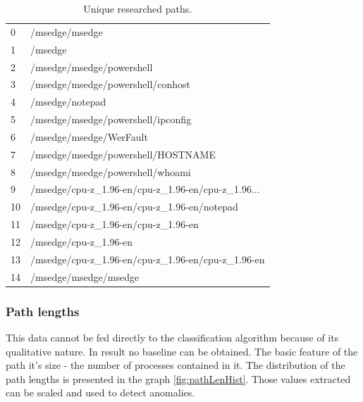 \documentclass[a4paper,twoside,12pt]{book}
\begin{document}
\begin{table}
	\centering
	\caption{Unique researched paths.}
	\label{id:tab:uniqPaths}
	\begin{tabular}{ll}
		\toprule
		0  &                                     /msedge/msedge \\
		1  &                                            /msedge \\
		2  &                          /msedge/msedge/powershell \\
		3  &                  /msedge/msedge/powershell/conhost \\
		4  &                                    /msedge/notepad \\
		5  &                 /msedge/msedge/powershell/ipconfig \\
		6  &                            /msedge/msedge/WerFault \\
		7  &                 /msedge/msedge/powershell/HOSTNAME \\
		8  &                   /msedge/msedge/powershell/whoami \\
		9  &  /msedge/cpu-z\_1.96-en/cpu-z\_1.96-en/cpu-z\_1.96... \\
		10 &        /msedge/cpu-z\_1.96-en/cpu-z\_1.96-en/notepad \\
		11 &                /msedge/cpu-z\_1.96-en/cpu-z\_1.96-en \\
		12 &                              /msedge/cpu-z\_1.96-en \\
		13 &  /msedge/cpu-z\_1.96-en/cpu-z\_1.96-en/cpu-z\_1.96-en \\
		14 &                              /msedge/msedge/msedge \\
		\bottomrule
	\end{tabular}
\end{table}

\subsubsection{Path lengths}

This data cannot be fed directly to the classification algorithm because of its 
qualitative nature. In result no baseline can be obtained. The basic feature
of the path it's size - the number of processes contained in it. The distribution
of the path lengths is presented in the graph \ref{fig:pathLenHist}. Those values
extracted can be scaled and used to detect anomalies.
\end{document}
